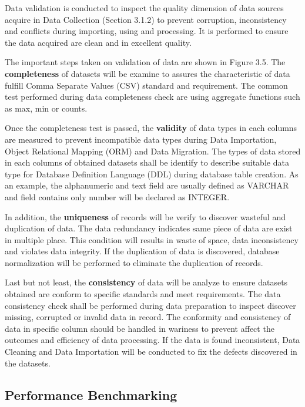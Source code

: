 Data validation is conducted to inspect the quality dimension of data sources acquire in Data Collection (Section 3.1.2) to prevent corruption, inconsistency and conflicts during importing, using and processing. It is performed to ensure the data acquired are clean and in excellent quality. 

The important steps taken on validation of data are shown in Figure 3.5. The \textbf{completeness} of datasets will be examine to assures the characteristic of data fulfill Comma Separate Values (CSV) standard and requirement. The common test performed during data completeness check are using aggregate functions such as max, min or counts. \cite{data-completeness-check}

Once the completeness test is passed, the \textbf{validity} of data types in each columns are measured to prevent incompatible data types during Data Importation, Object Relational Mapping (ORM) and Data Migration. The types of data stored in each columns of obtained datasets shall be identify to describe suitable data type for Database Definition Language (DDL) during database table creation. As an example, the alphanumeric and text field are usually defined as VARCHAR and field contains only number will be declared as INTEGER.  

In addition, the \textbf{uniqueness} of records will be verify to discover wasteful and duplication of data. The data redundancy indicates same piece of data are exist in multiple place. \cite{data-redundancy-definition} This condition will results in waste of space, data inconsistency and violates data integrity. If the duplication of data is discovered, database normalization will be performed to eliminate the duplication of records. 

Last but not least, the \textbf{consistency} of data will be analyze to ensure datasets obtained are conform to specific standards and meet requirements. The data consistency check shall be performed during data preparation to inspect discover missing, corrupted or invalid data in record. The conformity and consistency of data in specific column should be handled in wariness to prevent affect the outcomes and efficiency of data processing. If the data is found inconsistent, Data Cleaning and Data Importation will be conducted to fix the defects discovered in the datasets. 

\subsection{Performance Benchmarking}

